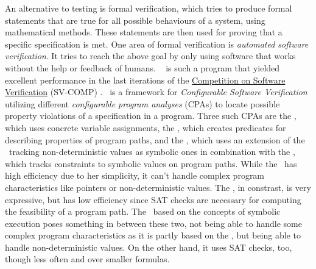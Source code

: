 An alternative to testing is formal verification, which tries to produce formal statements that are true for all possible behaviours of a system, using mathematical methods.
These statements are then used for proving that a specific specification is met.
One area of formal verification is \emph{automated software verification}. It tries to reach the above goal by only using software that works without the help or feedback of humans.
\CpaChecker\ \cite{Beyer2011} is such a program that yielded excellent performance in the last iterations of  the \href{http://sv-comp.sosy-lab.org}{Competition on Software Verification} (SV-COMP) \cite{SV-COMP2013} \cite{SV-COMP2014} \cite{SV-COMP2015}.
\CpaChecker\ is a framework for \emph{Configurable Software Verification} \cite{Beyer2007} utilizing different \emph{configurable program analyses} (CPAs) to locate possible property violations of a specification in a program.
Three such CPAs are the , which uses concrete variable assignments, the \predicateCPA, which creates predicates for describing properties of program paths,
and the \symbolicExecutionCPA, which uses an extension of the \ tracking non-deterministic values as symbolic ones in combination with the \constraintsCPA, which tracks constraints to symbolic values on program paths.
While the \ has high efficiency due to her simplicity, it can't handle complex program characteristics like pointers or non-deterministic values.
The \predicateCPA, in constrast, is very expressive, but has low efficiency since SAT checks are necessary for computing the feasibility of a program path.
The \symbolicExecutionCPA\ based on the concepts of symbolic execution \cite{King1976} poses something in between these two, not being able to handle some complex program characteristics as it is partly based on the , but being able to handle non-deterministic values.
On the other hand, it uses SAT checks, too, though less often and over smaller formulas.

